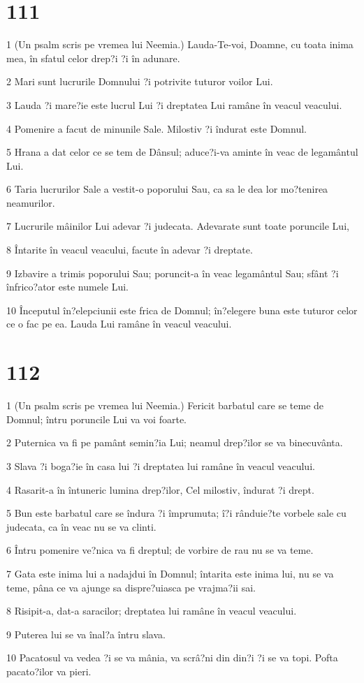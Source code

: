 \chapter{111}

\par 1 (Un psalm scris pe vremea lui Neemia.) Lauda-Te-voi, Doamne, cu toata inima mea, în sfatul celor drep?i ?i în adunare.
\par 2 Mari sunt lucrurile Domnului ?i potrivite tuturor voilor Lui.
\par 3 Lauda ?i mare?ie este lucrul Lui ?i dreptatea Lui ramâne în veacul veacului.
\par 4 Pomenire a facut de minunile Sale. Milostiv ?i îndurat este Domnul.
\par 5 Hrana a dat celor ce se tem de Dânsul; aduce?i-va aminte în veac de legamântul Lui.
\par 6 Taria lucrurilor Sale a vestit-o poporului Sau, ca sa le dea lor mo?tenirea neamurilor.
\par 7 Lucrurile mâinilor Lui adevar ?i judecata. Adevarate sunt toate poruncile Lui,
\par 8 Întarite în veacul veacului, facute în adevar ?i dreptate.
\par 9 Izbavire a trimis poporului Sau; poruncit-a în veac legamântul Sau; sfânt ?i înfrico?ator este numele Lui.
\par 10 Începutul în?elepciunii este frica de Domnul; în?elegere buna este tuturor celor ce o fac pe ea. Lauda Lui ramâne în veacul veacului.

\chapter{112}

\par 1 (Un psalm scris pe vremea lui Neemia.) Fericit barbatul care se teme de Domnul; întru poruncile Lui va voi foarte.
\par 2 Puternica va fi pe pamânt semin?ia Lui; neamul drep?ilor se va binecuvânta.
\par 3 Slava ?i boga?ie în casa lui ?i dreptatea lui ramâne în veacul veacului.
\par 4 Rasarit-a în întuneric lumina drep?ilor, Cel milostiv, îndurat ?i drept.
\par 5 Bun este barbatul care se îndura ?i împrumuta; î?i rânduie?te vorbele sale cu judecata, ca în veac nu se va clinti.
\par 6 Întru pomenire ve?nica va fi dreptul; de vorbire de rau nu se va teme.
\par 7 Gata este inima lui a nadajdui în Domnul; întarita este inima lui, nu se va teme, pâna ce va ajunge sa dispre?uiasca pe vrajma?ii sai.
\par 8 Risipit-a, dat-a saracilor; dreptatea lui ramâne în veacul veacului.
\par 9 Puterea lui se va înal?a întru slava.
\par 10 Pacatosul va vedea ?i se va mânia, va scrâ?ni din din?i ?i se va topi. Pofta pacato?ilor va pieri.

